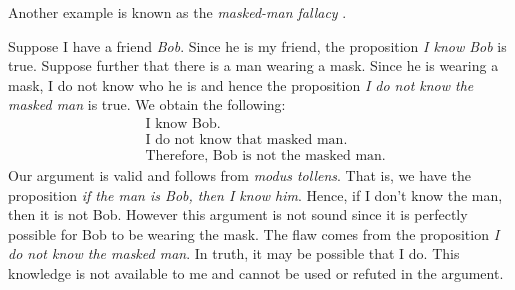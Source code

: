         Another example is known as the \textit{masked-man fallacy}%
        .
        \begin{example}
            \label{ex:Masked_Man_Fallacy}%
            Suppose I have a friend \textit{Bob}. Since he is my friend, the
            proposition \textit{I know Bob} is true. Suppose further that there
            is a man wearing a mask. Since he is wearing a mask, I do not know
            who he is and hence the proposition
            \textit{I do not know the masked man} is true. We obtain the
            following:
            \begin{subequations}
                \begin{align}
                    &\text{I know Bob}.\\
                    &\text{I do not know that masked man}.\\
                    &\text{Therefore, Bob is not the masked man}.
                \end{align}
            \end{subequations}
            Our argument is valid and follows from \textit{modus tollens}. That
            is, we have the proposition
            \textit{if the man is Bob, then I know him}. Hence, if I don't know
            the man, then it is not Bob. However this argument is not sound
            since it is perfectly possible for Bob to be wearing the mask. The
            flaw comes from the proposition
            \textit{I do not know the masked man}. In truth, it may be possible
            that I do. This knowledge is not available to me and cannot be used
            or refuted in the argument.
        \end{example}